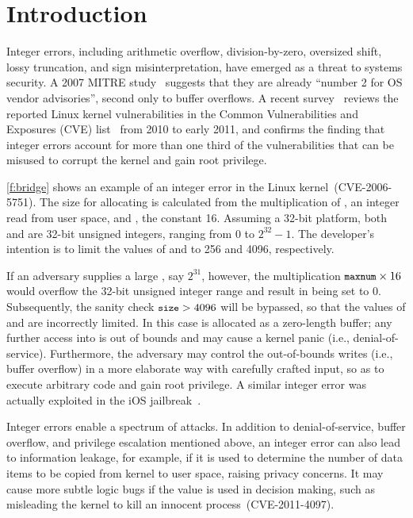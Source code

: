 \section{Introduction}
\label{s:intro}

Integer errors, including arithmetic overflow, division-by-zero,
oversized shift, lossy truncation, and sign misinterpretation, have
emerged as a threat to systems security.  A 2007 MITRE
study~\cite{christey:vuln} suggests that they are already ``number
2 for OS vendor advisories'', second only to buffer overflows.  A recent
survey~\cite{chen:kbugs} reviews the reported Linux kernel
vulnerabilities in the Common Vulnerabilities and Exposures (CVE)
list~\cite{cve} from 2010 to early 2011, and confirms the finding
that integer errors account for more than one third of the
vulnerabilities that can be misused to corrupt the kernel and gain
root privilege.

\autoref{f:bridge} shows an example of an integer error in the Linux
kernel~(CVE-2006-5751).  The size for allocating  is calculated
from the multiplication of , an integer read from user
space, and , the constant 16.  Assuming
a 32-bit platform, both  and  are 32-bit unsigned
integers, ranging from 0 to $2^{32} - 1$.  The developer's intention
is to limit the values of  and  to 256 and 4096,
respectively.

If an adversary supplies a large , say $2^{31}$,
however, the multiplication $\cc{maxnum} \times 16$ would
overflow the 32-bit unsigned integer range and result in 
being set to 0.  Subsequently, the sanity check $\cc{size} > 4096$
will be bypassed, so that the values of  and 
are incorrectly limited.  In this case  is allocated as
a zero-length buffer; any further access into  is out of
bounds and may cause a kernel panic (i.e., denial-of-service).
Furthermore, the adversary may control the out-of-bounds writes
(i.e., buffer overflow) in a more elaborate way with carefully
crafted input, so as to execute arbitrary code and gain root
privilege.  A similar integer error was actually exploited
in the iOS jailbreak~\cite{esser:ios}.

Integer errors enable a spectrum of attacks.  In addition to
denial-of-service, buffer overflow, and privilege escalation
mentioned above, an integer error can also lead to information
leakage, for example, if it is used to determine the number of data
items to be copied from kernel to user space, raising privacy
concerns.  It may cause more subtle logic bugs if the value is used
in decision making, such as misleading the kernel to kill an innocent
process~(CVE-2011-4097).

